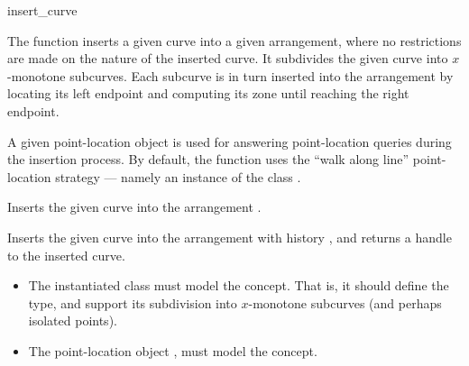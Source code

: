 \ccRefPageBegin

\begin{ccRefFunction}{insert_curve}

\ccDefinition

The function \ccRefName{} inserts a given curve into a given arrangement,
where no restrictions are made on the nature of the inserted curve.
It subdivides the given curve into $x$-monotone subcurves. Each subcurve
is in turn inserted into the arrangement by locating its left endpoint
and computing its zone until reaching the right endpoint.

A given point-location object is used for answering point-location queries
during the insertion process. By default, the function uses the
``walk along line'' point-location strategy --- namely an instance of the
class .



Inserts the given curve  into the arrangement .




Inserts the given curve  into the arrangement with history
, and returns a handle to the inserted curve.

\ccRequirements
\begin{itemize}
\item The instantiated  class must model the
   concept. That is, it should define the
   type, and support its subdivision into $x$-monotone
  subcurves (and perhaps isolated points).
\item The point-location object , must model the
   concept.
\end{itemize}

\end{ccRefFunction}

\ccRefPageEnd
